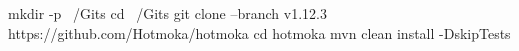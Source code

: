 \begin{shellcommandbox}\begin{ttlst}
mkdir -p ~/Gits
cd ~/Gits
git clone --branch v1.12.3 https://github.com/Hotmoka/hotmoka
cd hotmoka
mvn clean install -DskipTests
\end{ttlst}\end{shellcommandbox}
